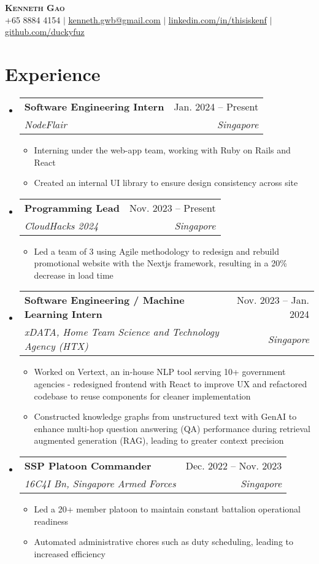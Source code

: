 \documentclass[letterpaper,11pt]{article}
\makeatletter
\newcommand{\resumeItem}[1]{
  \item\small{
    {#1 \vspace{-2pt}}
  }
}
\newcommand{\resumeSubheading}[4]{
  \vspace{-2pt}\item
    \begin{tabular*}{0.97\textwidth}[t]{l@{\extracolsep{\fill}}r}
      \textbf{#1} & #2 \\
      \textit{\small#3} & \textit{\small #4} \\
    \end{tabular*}\vspace{-7pt}
}
\newcommand{\resumeSubHeadingListStart}{\begin{itemize}[leftmargin=0.15in, label={}]}
\newcommand{\resumeSubHeadingListEnd}{\end{itemize}}
\newcommand{\resumeItemListStart}{\begin{itemize}}
\newcommand{\resumeItemListEnd}{\end{itemize}\vspace{-5pt}}
\makeatother
\begin{document}

\begin{center}
    \textbf{\Huge \scshape Kenneth Gao} \\ \vspace{1pt}
    \small +65 8884 4154 $|$ \href{mailto:kenneth.gwb@gmail.com}{\underline{kenneth.gwb@gmail.com}} $|$ 
    \href{https://linkedin.com/in/thisiskenf/}{\underline{linkedin.com/in/thisiskenf}} $|$
    \href{https://github.com/duckyfuz/}{\underline{github.com/duckyfuz}}
\end{center}

\section{Experience}
  \resumeSubHeadingListStart
    \resumeSubheading
      {Software Engineering Intern}{Jan. 2024 -- Present}
      {NodeFlair}{Singapore}
      \resumeItemListStart
        \resumeItem{Interning under the web-app team, working with Ruby on Rails and React}
        \resumeItem{Created an internal UI library to ensure design consistency across site}
      \resumeItemListEnd
    \resumeSubheading
      {Programming Lead}{Nov. 2023 -- Present}
      {CloudHacks 2024}{Singapore}
      \resumeItemListStart
        \resumeItem{Led a team of 3 using Agile methodology to redesign and rebuild promotional website with the Nextjs framework, resulting in a 20\% decrease in load time}
      \resumeItemListEnd
    \resumeSubheading
      {Software Engineering / Machine Learning Intern}{Nov. 2023 -- Jan. 2024}
      {xDATA, Home Team Science and Technology Agency (HTX)}{Singapore}
      \resumeItemListStart
        \resumeItem{Worked on Vertext, an in-house NLP tool serving 10+ government agencies - redesigned frontend with React to improve UX and refactored codebase to reuse components for cleaner implementation}
        \resumeItem{Constructed knowledge graphs from unstructured text with GenAI to enhance multi-hop question answering (QA) performance during retrieval augmented generation (RAG), leading to greater context precision}
    \resumeItemListEnd
    \resumeSubheading
      {SSP Platoon Commander}{Dec. 2022 -- Nov. 2023}
      {16C4I Bn, Singapore Armed Forces}{Singapore}
      \resumeItemListStart
        \resumeItem{Led a 20+ member platoon to maintain constant battalion operational readiness}
        \resumeItem{Automated administrative chores such as duty scheduling, leading to increased efficiency}
      \resumeItemListEnd
  \resumeSubHeadingListEnd
\end{document}
